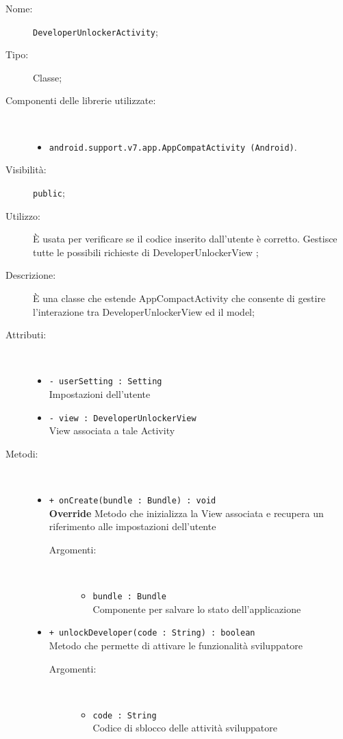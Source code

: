 \documentclass[../DefinizioneDiProdotto.tex]{subfiles}
\begin{document}
\begin{description}
	\item[Nome:] \texttt{DeveloperUnlockerActivity};
	\item[Tipo:] Classe;
	\item[Componenti delle librerie utilizzate:] \
	\begin{itemize}
		\item \texttt{android.support.v7.app.AppCompatActivity (Android)}.
		
	\end{itemize}
	\item[Visibilità:] \texttt{public};
	\item[Utilizzo:] È usata per verificare se il codice inserito dall'utente è corretto. Gestisce tutte le possibili richieste di DeveloperUnlockerView ;
	\item[Descrizione:] È una classe che estende AppCompactActivity che consente di gestire l'interazione tra DeveloperUnlockerView ed il model;
	\item[Attributi:] \
	\begin{itemize}
		\item \texttt{- userSetting : Setting}\\
		Impostazioni dell'utente
		
		\item \texttt{- view : DeveloperUnlockerView}\\
		View associata a tale Activity
		
	\end{itemize}
	\item[Metodi:] \
	\begin{itemize}
		\item \texttt{+ onCreate(bundle : Bundle) : void}\\
		\textbf{Override} Metodo che inizializza la View associata e recupera un riferimento alle impostazioni dell'utente
		\begin{description}
			\item[Argomenti:] \
			\begin{itemize}
				\item \texttt{bundle : Bundle}\\
				Componente per salvare lo stato dell'applicazione\end{itemize}
		\end{description}
		\item \texttt{+ unlockDeveloper(code : String) : boolean}\\
		Metodo che permette di attivare le funzionalità sviluppatore
		\begin{description}
			\item[Argomenti:] \
			\begin{itemize}
				\item \texttt{code : String}\\
				Codice di sblocco delle attività sviluppatore\end{itemize}
		\end{description}
	\end{itemize}
\end{description}
\end{document}
